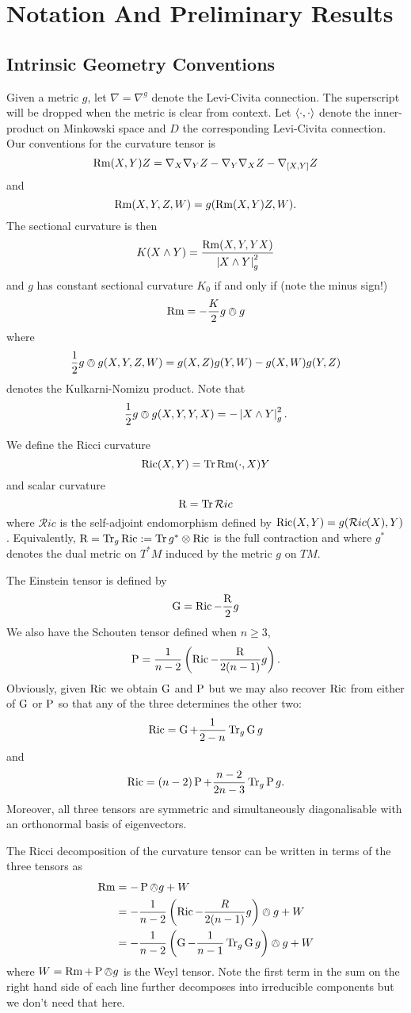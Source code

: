 \documentclass[a4paper, 12pt]{amsart}
\begin{document}
\section{Notation And Preliminary Results}
\label{sec:notation}

\subsection{Intrinsic Geometry Conventions}
\label{subsec:notation_intrinsic}

Given a metric \(g\), let \(\nabla = \nabla^g\) denote the Levi-Civita connection. The superscript will be dropped when the metric is clear from context. Let \(\left\langle \cdot,\cdot \right\rangle\) denote the inner-product on Minkowski space and \(D\) the corresponding Levi-Civita connection. Our conventions for the curvature tensor is
\[
\operatorname{Rm}(X, Y) Z = \nabla_X \nabla_Y Z - \nabla_Y \nabla_X Z - \nabla_{[X, Y]} Z
\]
and
\[
\operatorname{Rm}(X, Y, Z, W) = g(\operatorname{Rm}(X, Y) Z, W).
\]
The sectional curvature is then
\[
K(X \wedge Y) = \frac{\operatorname{Rm}(X, Y, Y X)}{\left\lvert{X \wedge Y}\right\rvert_g^2}
\]
and \(g\) has constant sectional curvature \(K_0\) if and only if (note the minus sign!)
\[
\operatorname{Rm} = -\frac{K}{2} g \owedge g
\]
where
\[
\frac{1}{2} g \owedge g (X, Y, Z, W) = g(X, Z) g (Y, W) - g(X, W) g(Y, Z)
\]
denotes the Kulkarni-Nomizu product. Note that
\[
\frac{1}{2} g \owedge g (X, Y, Y, X) = -\left\lvert{X \wedge Y}\right\rvert_g^2.
\]

We define the Ricci curvature
\[
\operatorname{Ric}(X, Y) = \operatorname{Tr} \operatorname{Rm}(\cdot, X) Y
\]
and scalar curvature
\[
\operatorname{R} = \operatorname{Tr} \mathcal{R}ic
\]
where \(\mathcal{R}ic\) is the self-adjoint endomorphism defined by \(\operatorname{Ric}(X, Y) = g(\mathcal{R}ic(X), Y)\). Equivalently, \(\operatorname{R} = \operatorname{Tr}_g \operatorname{Ric} := \operatorname{Tr} g^{\ast} \otimes \operatorname{Ric}\) is the full contraction and where \(g^{\ast}\) denotes the dual metric on \(T^{\ast}M\) induced by the metric \(g\) on \(TM\).

The Einstein tensor is defined by
\[
\operatorname{G} = \operatorname{Ric} - \frac{\operatorname{R}}{2} g
\]
We also have the Schouten tensor defined when \(n \geq 3\),
\[
\operatorname{P} = \frac{1}{n-2} \left(\operatorname{Ric} - \frac{\operatorname{R}}{2(n-1)}g \right).
\]
Obviously, given \(\operatorname{Ric}\) we obtain \(\operatorname{G}\) and \(\operatorname{P}\) but we may also recover \(\operatorname{Ric}\) from either of \(\operatorname{G}\) or \(\operatorname{P}\) so that any of the three determines the other two:
\[
\operatorname{Ric} = \operatorname{G} + \frac{1}{2-n} \operatorname{Tr}_g \operatorname{G} g
\]
and
\[
\operatorname{Ric} = (n-2) \operatorname{P} + \frac{n-2}{2n-3} \operatorname{Tr}_g \operatorname{P} g.
\]
Moreover, all three tensors are symmetric and simultaneously diagonalisable with an orthonormal basis of eigenvectors.

The Ricci decomposition of the curvature tensor can be written in terms of the three tensors as
\begin{align*}
\operatorname{Rm} &= -\operatorname{P} \owedge g + W \\
&= -\frac{1}{n-2} \left(\operatorname{Ric} - \frac{R}{2(n-1)} g\right) \owedge g + W \\
&= -\frac{1}{n-2} \left(\operatorname{G}  -\frac{1}{n-1} \operatorname{Tr}_g \operatorname{G} g\right) \owedge g + W
\end{align*}
where \(W = \operatorname{Rm} + \operatorname{P} \owedge g\) is the Weyl tensor. Note the first term in the sum on the right hand side of each line further decomposes into irreducible components but we don't need that here.
\end{document}
